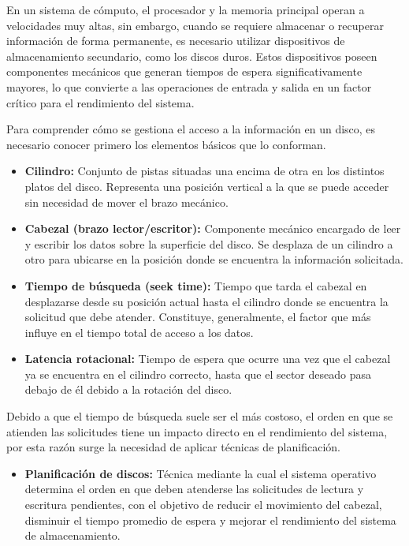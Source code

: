 \documentclass[14pt,letterpaper]{extarticle}
\begin{document}
En un sistema de cómputo, el procesador y la memoria principal operan a velocidades muy altas, sin embargo, cuando se requiere almacenar o recuperar información de forma permanente, es necesario utilizar dispositivos de almacenamiento secundario, como los discos duros. Estos dispositivos poseen componentes mecánicos que generan tiempos de espera significativamente mayores, lo que convierte a las operaciones de entrada y salida en un factor crítico para el rendimiento del sistema.

Para comprender cómo se gestiona el acceso a la información en un disco, es necesario conocer primero los elementos básicos que lo conforman.

\begin{itemize}
    \item \textbf{Cilindro:} Conjunto de pistas situadas una encima de otra en los distintos platos del disco. Representa una posición vertical a la que se puede acceder sin necesidad de mover el brazo mecánico.
    \item \textbf{Cabezal (brazo lector/escritor):} Componente mecánico encargado de leer y escribir los datos sobre la superficie del disco. Se desplaza de un cilindro a otro para ubicarse en la posición donde se encuentra la información solicitada.
    \item \textbf{Tiempo de búsqueda (seek time):} Tiempo que tarda el cabezal en desplazarse desde su posición actual hasta el cilindro donde se encuentra la solicitud que debe atender. Constituye, generalmente, el factor que más influye en el tiempo total de acceso a los datos.
    \item \textbf{Latencia rotacional:} Tiempo de espera que ocurre una vez que el cabezal ya se encuentra en el cilindro correcto, hasta que el sector deseado pasa debajo de él debido a la rotación del disco.
\end{itemize}

Debido a que el tiempo de búsqueda suele ser el más costoso, el orden en que se atienden las solicitudes tiene un impacto directo en el rendimiento del sistema, por esta razón surge la necesidad de aplicar técnicas de planificación.

\begin{itemize}
    \item \textbf{Planificación de discos:} Técnica mediante la cual el sistema operativo determina el orden en que deben atenderse las solicitudes de lectura y escritura pendientes, con el objetivo de reducir el movimiento del cabezal, disminuir el tiempo promedio de espera y mejorar el rendimiento del sistema de almacenamiento.
\end{itemize}
\end{document}
